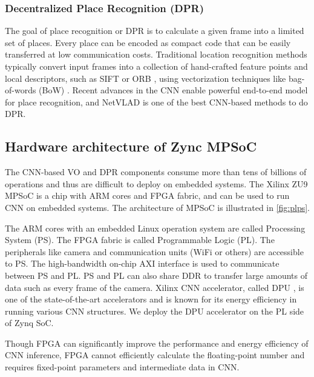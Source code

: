 \subsubsection{Decentralized Place Recognition (DPR)}

The goal of place recognition or DPR is to calculate a given frame into a limited set of places. Every place can be encoded as compact code that can be easily transferred at low communication costs. Traditional location recognition methods typically convert input frames into a collection of hand-crafted feature points and local descriptors, such as SIFT \cite{Lowe:2004e6e} or ORB \cite{Mur-Artal:2017281}, using vectorization techniques like bag-of-words (BoW) \cite{Galvez-Lopez:2012c94}. 
Recent advances \cite{Arandjelovic:2017997, Noh:2017d0b} in the CNN enable powerful end-to-end model for place recognition, and NetVLAD is one of the best CNN-based methods to do DPR. 

\subsection{Hardware architecture of Zync MPSoC}

The CNN-based VO and DPR components consume more than tens of billions of operations and thus are difficult to deploy on embedded systems. The Xilinx ZU9 MPSoC is a chip with ARM cores and FPGA fabric, and can be used to run CNN on embedded systems. The architecture of MPSoC is illustrated in \cref{fig:plps}.

The ARM cores with an embedded Linux operation system are called Processing System (PS). The FPGA fabric is called Programmable Logic (PL). The peripherals like camera and communication units (WiFi or others) are accessible to PS. The high-bandwidth on-chip AXI interface is used to communicate between PS and PL. PS and PL can also share DDR to transfer large amounts of data such as every frame of the camera.
Xilinx CNN accelerator, called DPU \cite{Tech:2019360}, is one of the state-of-the-art accelerators and is known for its energy efficiency in running various CNN structures. We deploy the DPU accelerator on the PL side of Zynq SoC.

Though FPGA can significantly improve the performance and energy efficiency of CNN inference, FPGA cannot efficiently calculate the floating-point number and requires fixed-point parameters and intermediate data in CNN.

